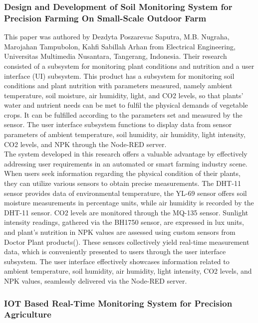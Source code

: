\documentclass[12pt, a4paper]{article}
\begin{document}
\subsubsection{Design and Development of Soil Monitoring System for Precision Farming On Small-Scale Outdoor Farm}
This paper was authored by Dezdyta Poszarevac Saputra, M.B. Nugraha, Marojahan Tampubolon, Kahfi Sabillah Arhan \cite{10435334} from Electrical Engineering, Universitas Multimedia Nusantara, Tangerang, Indonesia.
Their research consisted of a subsystem for monitoring plant conditions and nutrition and a user interface (UI) subsystem. This product has a subsystem for monitoring soil conditions and plant nutrition with parameters measured, namely ambient temperature, soil moisture, air humidity, light, and CO2 levels, so that plants’ water and nutrient needs can be met to fulfil the physical demands of vegetable crops. It can be fulfilled according to the parameters set and measured by the sensor. The user interface subsystem functions to display data from sensor parameters of ambient temperature, soil humidity, air humidity, light intensity, CO2 levels, and NPK through the Node-RED server.\\
The system developed in this research offers a valuable advantage by effectively addressing user requirements in an automated or smart farming industry scene. When users seek information regarding the physical condition of their plants, they can utilize various sensors to obtain precise measurements. The DHT-11 sensor provides data of environmental temperature, the YL-69 sensor offers soil moisture measurements in percentage units, while air humidity is recorded by the DHT-11 sensor. CO2 levels are monitored through the MQ-135 sensor. Sunlight intensity readings, gathered via the BH1750 sensor, are expressed in lux units, and plant’s nutrition in NPK values are assessed using custom sensors from Doctor Plant products(). These sensors collectively yield real-time measurement data, which is conveniently presented to users through the user interface subsystem. The user interface effectively showcases information related to ambient temperature, soil humidity, air humidity, light intensity, CO2 levels, and NPK values, seamlessly delivered via the Node-RED server.

\subsubsection{IOT Based Real-Time Monitoring System for Precision Agriculture}
\end{document}
